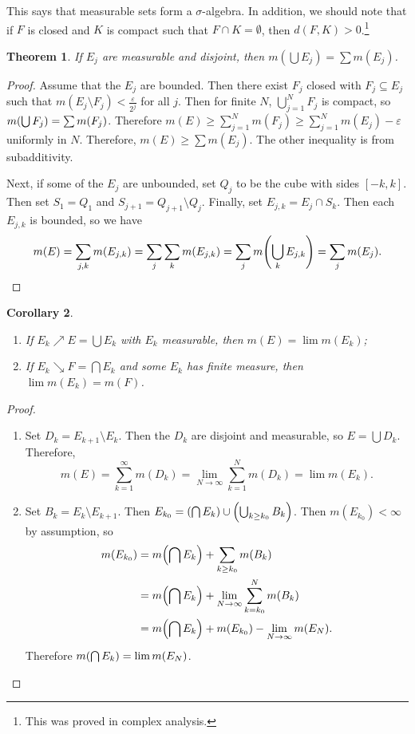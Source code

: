 \documentclass[leqno, openany]{memoir}
\newtheorem{thm}{Theorem}[chapter]
\newtheorem{cor}[thm]{Corollary}
\theoremstyle{definition}
\theoremstyle{remark}
\theoremstyle{plain}
\theoremstyle{definition}
\theoremstyle{remark}
\newcommand{\ep}{\varepsilon}
\begin{document}
This says that measurable sets form a $\sigma$-algebra. In addition, we should note that if $F$ is closed and $K$ is compact such that $F \cap K = \emptyset$, then $d(F,K) > 0$.\footnote{This was proved in complex analysis.}

\begin{thm}
    If $E_j$ are measurable and disjoint, then $m(\bigcup E_j) = \sum m(E_j)$.
\end{thm}

\begin{proof}
    Assume that the $E_j$ are bounded. Then there exist $F_j$ closed with $F_j \subseteq E_j$ such that $m(E_j \setminus F_j) < \frac{\ep}{2^j}$ for all $j$. Then for finite $N$, $\bigcup_{j=1}^N F_j$ is compact, so $m\qty(\bigcup F_j) = \sum m(F_j)$. Therefore $m(E) \geq \sum_{j=1}^N m(F_j) \geq \sum_{j=1}^N m(E_j) - \ep$ uniformly in $N$. Therefore, $m(E) \geq \sum m(E_j)$. The other inequality is from subadditivity.

    Next, if some of the $E_j$ are unbounded, set $Q_j$ to be the cube with sides $[-k,k]$. Then set $S_1 = Q_1$ and $S_{j+1} = Q_{j+1} \setminus Q_j$. Finally, set $E_{j,k} = E_j \cap S_k$. Then each $E_{j,k}$ is bounded, so we have
    \[ m(E) = \sum_{j,k} m(E_{j,k}) = \sum_j \sum_k m(E_{j,k}) = \sum_j m\qty(\bigcup_k E_{j,k}) = \sum_j m(E_j). \qedhere \]
\end{proof}

\begin{cor}
    \begin{enumerate}
        \item If $E_k \nearrow E = \bigcup E_k$ with $E_k$ measurable, then $m(E) = \lim m(E_k)$;
        \item If $E_k \searrow F = \bigcap E_k$ and some $E_k$ has finite measure, then $\lim m(E_k) = m(F)$.
    \end{enumerate}
\end{cor}

\begin{proof}
    \begin{enumerate}
        \item Set $D_k = E_{k+1} \setminus E_k$. Then the $D_k$ are disjoint and measurable, so $E = \bigcup D_k$. Therefore, 
            \[ m(E) = \sum_{k=1}^{\infty} m(D_k) = \lim_{N \to \infty} \sum_{k=1}^N m(D_k) = \lim m(E_k). \]
        \item Set $B_k = E_k \setminus E_{k+1}$. Then $E_{k_0} = \qty(\bigcap E_k) \cup \qty(\bigcup_{k\geq k_0} B_k)$. Then $m(E_{k_0}) < \infty$ by assumption, so 
            \begin{align*}
                m(E_{k_0}) &= m\qty(\bigcap E_k) + \sum_{k \geq k_0} m(B_k) \\
                           &= m\qty(\bigcap E_k) + \lim_{N \to \infty} \sum_{k=k_0}^{N} m(B_k) \\
                           &= m\qty(\bigcap E_k) + m(E_{k_0}) - \lim_{N \to \infty} m (E_N). 
            \end{align*}
            Therefore $m\qty(\bigcap E_k) = \lim m(E_N)$.
    \end{enumerate}
\end{proof}
\end{document}
